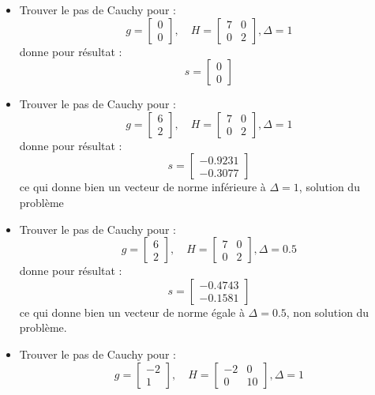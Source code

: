 \documentclass[12pt]{article}	%
\begin{document}
\begin{itemize}
	\item Trouver le pas de Cauchy pour :
		\[g = \left[\begin{array}{c}0\\0\end{array}\right],\quad H = \left[\begin{array}{cc}7&0\\0&2\end{array}\right], \Delta = 1\]
		donne pour résultat :
		\[s = \left[\begin{array}{c}0\\0\end{array}\right]\]
	\item Trouver le pas de Cauchy pour :
		\[g = \left[\begin{array}{c}6\\2\end{array}\right],\quad H = \left[\begin{array}{cc}7&0\\0&2\end{array}\right], \Delta = 1\]
		donne pour résultat :
		\[s = \left[\begin{array}{c}-0.9231\\-0.3077\end{array}\right]\]
		ce qui donne bien un vecteur de norme inférieure à $\Delta = 1$, solution du problème
	\item Trouver le pas de Cauchy pour :
		\[g = \left[\begin{array}{c}6\\2\end{array}\right],\quad H = \left[\begin{array}{cc}7&0\\0&2\end{array}\right], \Delta = 0.5\]
		donne pour résultat :
		\[s = \left[\begin{array}{c}-0.4743\\-0.1581\end{array}\right]\]
		ce qui donne bien un vecteur de norme égale à $\Delta = 0.5$, non solution du problème.
	\item Trouver le pas de Cauchy pour :
		\[g = \left[\begin{array}{c}-2\\1\end{array}\right],\quad H = \left[\begin{array}{cc}-2&0\\0&10\end{array}\right], \Delta = 1\]

\end{itemize}
\end{document}

